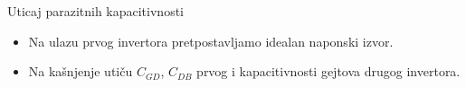 \begin{frame}[label=09_3-s008]{Uticaj parazitnih kapacitivnosti}
\begin{center}

\end{center}\begin{itemize}
\item Na ulazu prvog invertora pretpostavljamo idealan naponski izvor.
\item Na kašnjenje utiču $C_{GD}$, $C_{DB}$ prvog i kapacitivnosti gejtova drugog invertora.
\end{itemize}
\end{frame}
